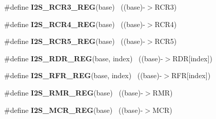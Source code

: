 \begin{DoxyCompactItemize}
\item 
\hypertarget{group___i2_s___register___accessor___macros_gad37ff97af99ab3c5fd2e44ab0eccb259}{}\#define {\bfseries I2\+S\+\_\+\+R\+C\+R3\+\_\+\+R\+E\+G}(base)                                          ~((base)-\/$>$R\+C\+R3)\label{group___i2_s___register___accessor___macros_gad37ff97af99ab3c5fd2e44ab0eccb259}

\item 
\hypertarget{group___i2_s___register___accessor___macros_ga2979fce419e19c97551d0b5e0b0a61d4}{}\#define {\bfseries I2\+S\+\_\+\+R\+C\+R4\+\_\+\+R\+E\+G}(base)                                          ~((base)-\/$>$R\+C\+R4)\label{group___i2_s___register___accessor___macros_ga2979fce419e19c97551d0b5e0b0a61d4}

\item 
\hypertarget{group___i2_s___register___accessor___macros_ga48e6d5a9cf36845fb8ccbbfe785f07a8}{}\#define {\bfseries I2\+S\+\_\+\+R\+C\+R5\+\_\+\+R\+E\+G}(base)                                          ~((base)-\/$>$R\+C\+R5)\label{group___i2_s___register___accessor___macros_ga48e6d5a9cf36845fb8ccbbfe785f07a8}

\item 
\hypertarget{group___i2_s___register___accessor___macros_ga18b3e6efd2a957d910429a72b273bea9}{}\#define {\bfseries I2\+S\+\_\+\+R\+D\+R\+\_\+\+R\+E\+G}(base,  index)                                ~((base)-\/$>$R\+D\+R\mbox{[}index\mbox{]})\label{group___i2_s___register___accessor___macros_ga18b3e6efd2a957d910429a72b273bea9}

\item 
\hypertarget{group___i2_s___register___accessor___macros_ga0c209378f864f66e1f88468118ee87aa}{}\#define {\bfseries I2\+S\+\_\+\+R\+F\+R\+\_\+\+R\+E\+G}(base,  index)                                ~((base)-\/$>$R\+F\+R\mbox{[}index\mbox{]})\label{group___i2_s___register___accessor___macros_ga0c209378f864f66e1f88468118ee87aa}

\item 
\hypertarget{group___i2_s___register___accessor___macros_ga11a80a8a47223925c708e60a75377225}{}\#define {\bfseries I2\+S\+\_\+\+R\+M\+R\+\_\+\+R\+E\+G}(base)                                            ~((base)-\/$>$R\+M\+R)\label{group___i2_s___register___accessor___macros_ga11a80a8a47223925c708e60a75377225}

\item 
\hypertarget{group___i2_s___register___accessor___macros_ga26a2c268216712ec124ea5d78a0978e8}{}\#define {\bfseries I2\+S\+\_\+\+M\+C\+R\+\_\+\+R\+E\+G}(base)                                            ~((base)-\/$>$M\+C\+R)\label{group___i2_s___register___accessor___macros_ga26a2c268216712ec124ea5d78a0978e8}


\end{DoxyCompactItemize}
